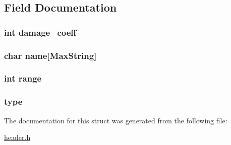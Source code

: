 \subsection{Field Documentation}
\hypertarget{structt__skill_a9518a5f7d916a01def3588da5dc0c8fa}{
\subsubsection[{damage\-\_\-coeff}]{\setlength{\rightskip}{0pt plus 5cm}int damage\-\_\-coeff}}\label{structt__skill_a9518a5f7d916a01def3588da5dc0c8fa}
\hypertarget{structt__skill_ab27f28c5ead39031421706ddbbd1edea}{
\subsubsection[{name}]{\setlength{\rightskip}{0pt plus 5cm}char name\mbox{[}{\bf Max\-String}\mbox{]}}}\label{structt__skill_ab27f28c5ead39031421706ddbbd1edea}
\hypertarget{structt__skill_a037e8e370380046bec287bdc96942091}{
\subsubsection[{range}]{\setlength{\rightskip}{0pt plus 5cm}int range}}\label{structt__skill_a037e8e370380046bec287bdc96942091}
\hypertarget{structt__skill_ac00edc3c188c78c47878a357ecff2954}{
\subsubsection[{type}]{ type}}\label{structt__skill_ac00edc3c188c78c47878a357ecff2954}


The documentation for this struct was generated from the following file\-:\begin{DoxyCompactItemize}
\item 
\hyperlink{header_8h}{header.\-h}\end{DoxyCompactItemize}
